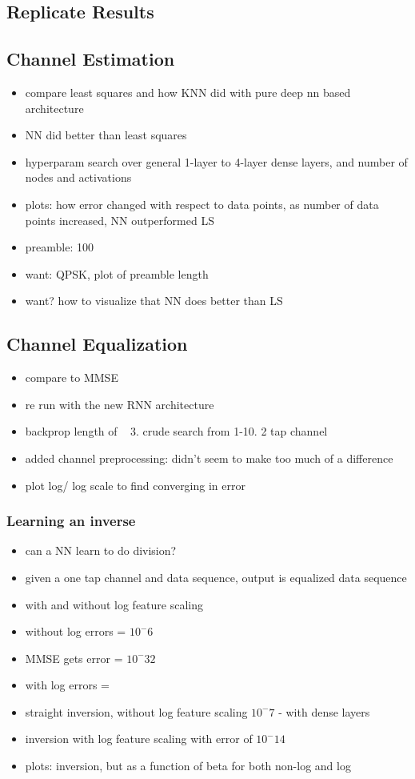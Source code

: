 \subsection{Replicate Results}

\subsection{Channel Estimation}

\begin{itemize}
\item compare least squares and how KNN did with pure deep nn based architecture
\item NN did better than least squares
\item hyperparam search over general 1-layer to 4-layer dense layers, and number of nodes and activations
\item plots: how error changed with respect to data points, as number of data points increased, NN outperformed LS
\item preamble: 100
\item want: QPSK, plot of preamble length
\item want? how to visualize that NN does better than LS
\end{itemize}

\subsection{Channel Equalization}

\begin{itemize}
\item compare to MMSE
\item re run with the new RNN architecture
\item backprop length of ~ 3. crude search from 1-10. 2 tap channel
\item added channel preprocessing: didn't seem to make too much of a difference
\item plot log/ log scale to find converging in error
\end{itemize}

\subsubsection{Learning an inverse}
\begin{itemize}
\item can a NN learn to do division?
\item given a one tap channel and data sequence, output is equalized data sequence
\item with and without log feature scaling
\item without log errors = $10^-6$
\item MMSE gets error = $10^-32$
\item with log errors = 
\item straight inversion, without log feature scaling $10^-7$ - with dense layers
\item inversion with log feature scaling with error of $10^-14$ 
\item plots: inversion, but as a function of beta for both non-log and log
\end{itemize}

